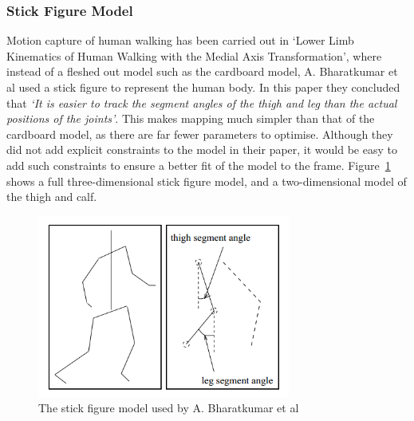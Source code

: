 \subsubsection{Stick Figure Model}

Motion capture of human walking has been carried out in `Lower Limb Kinematics of Human Walking with the Medial Axis Transformation'\cite{stickfigure}, where instead of a fleshed out model such as the cardboard model, A. Bharatkumar et al used a stick figure to represent the human body. In this paper they concluded that \emph{`It is easier to track the segment angles of the thigh and leg than the actual positions of the joints'}. This makes mapping much simpler than that of the cardboard model, as there are far fewer parameters to optimise. Although they did not add explicit constraints to the model in their paper, it would be easy to add such constraints to ensure a better fit of the model to the frame. Figure~\ref{fig:stickfiguremodel} shows a full three-dimensional stick figure model, and a two-dimensional model of the thigh and calf.

\begin{figure}[H]
    \centering
    \includegraphics[height=6cm]{background/images/stickfigure}

	\caption{The stick figure model used by A. Bharatkumar et al\cite{stickfigure}}
	\label{fig:stickfiguremodel}
\end{figure}
